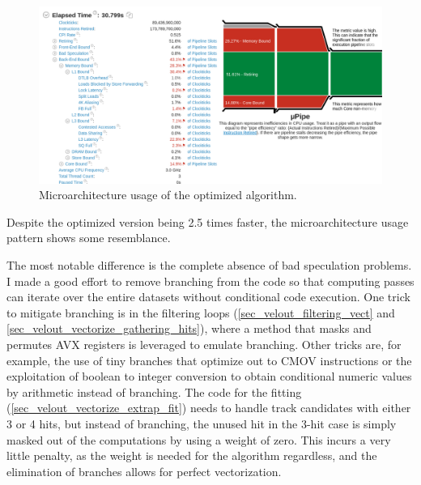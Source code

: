 \documentclass[12pt]{article}
\begin{document}
\begin{figure}[H]
	\begin{center}
		\includegraphics[width=\textwidth]{velout_uarch_overall_opt}
	\end{center}
	\caption{Microarchitecture usage of the optimized algorithm.}
	\label{fig_velout_uarch_overall_opt}
\end{figure}

Despite the optimized version being 2.5 times faster, the microarchitecture usage pattern shows some resemblance.

The most notable difference is the complete absence of bad speculation problems. I made a good effort to remove branching from the code so that computing passes can iterate over the entire datasets without conditional code execution. One trick to mitigate branching is in the filtering loops (\ref{sec_velout_filtering_vect} and \ref{sec_velout_vectorize_gathering_hits}), where a method that masks and permutes AVX registers is leveraged to emulate branching. Other tricks are, for example, the use of tiny branches that optimize out to CMOV instructions or the exploitation of boolean to integer conversion to obtain conditional numeric values by arithmetic instead of branching. The code for the fitting (\ref{sec_velout_vectorize_extrap_fit}) needs to handle track candidates with either 3 or 4 hits, but instead of branching, the unused hit in the 3-hit case is simply masked out of the computations by using a weight of zero. This incurs a very little penalty, as the weight is needed for the algorithm regardless, and the elimination of branches allows for perfect vectorization.

\vspace{1pc}
\end{document}
